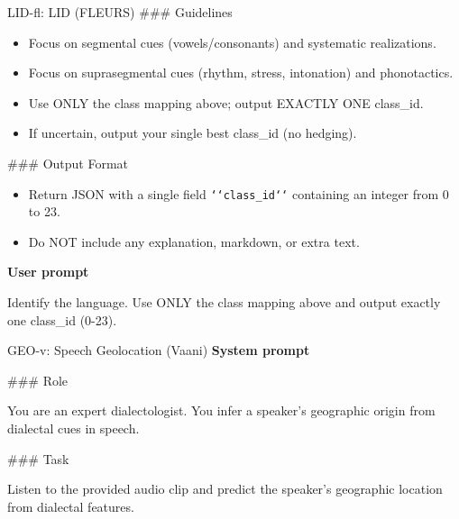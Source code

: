 {\begin{promptbox}{LID-fl: LID (FLEURS)}
\noindent\#\#\# Guidelines
\par
\begin{itemize}[leftmargin=*,noitemsep,topsep=2pt]
  \item Focus on segmental cues (vowels/consonants) and systematic realizations.
  \item Focus on suprasegmental cues (rhythm, stress, intonation) and phonotactics.
  \item Use ONLY the class mapping above; output EXACTLY ONE class\_id.
  \item If uncertain, output your single best class\_id (no hedging).
\end{itemize}

\noindent\#\#\# Output Format
\par
\begin{itemize}[leftmargin=*,noitemsep,topsep=2pt]
  \item Return JSON with a single field \texttt{\string`\string`class\_id\string`\string`} containing an integer from 0 to 23.
  \item Do NOT include any explanation, markdown, or extra text.
\end{itemize}

\par\vspace{2pt}
\textbf{User prompt}\par\vspace{2pt}
\noindent
Identify the language. Use ONLY the class mapping above and output exactly one class\_id (0-23).
\end{promptbox}

\par\vspace{4pt}
\begin{promptbox}{GEO-v: Speech Geolocation (Vaani)}
\textbf{System prompt}\par\vspace{2pt}
\noindent\#\#\# Role
\par
You are an expert dialectologist. You infer a speaker's geographic origin from dialectal cues in speech.
\par\vspace{2pt}

\noindent\#\#\# Task
\par
Listen to the provided audio clip and predict the speaker's geographic location from dialectal features.
\par\vspace{2pt}


\end{promptbox}}
